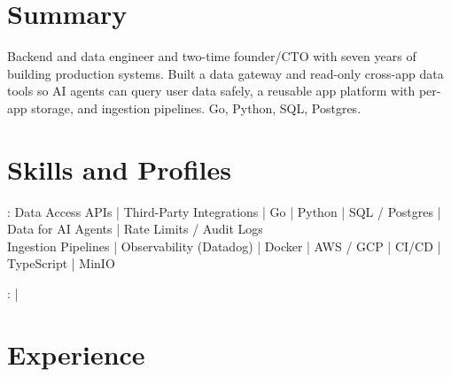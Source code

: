 \documentclass[print]{jack-resume}
\begin{document}
\pagecolor{darkmodeBackground}


\begin{minipage}[t][1cm][t]{.03\textwidth}
    \hfill
\end{minipage}

\section{Summary}
Backend and data engineer and two-time founder/CTO with seven years of building production systems. Built a data gateway and read-only cross-app data tools so AI agents can query user data safely, a reusable app platform with per-app storage, and ingestion pipelines. Go, Python, SQL, Postgres.
\sectionsep

\section{Skills and Profiles}
:
Data Access APIs \hfill | \hfill
Third-Party Integrations \hfill | \hfill
Go \hfill | \hfill
Python \hfill | \hfill
SQL / Postgres \hfill | \hfill
Data for AI Agents \hfill | \hfill
Rate Limits / Audit Logs \\
\hspace{1.0cm} Ingestion Pipelines \hfill | \hfill
Observability (Datadog) \hfill | \hfill
Docker \hfill | \hfill
AWS / GCP \hfill | \hfill
CI/CD \hfill | \hfill
TypeScript \hfill | \hfill
MinIO \\

\raggedright{
    :
      \href{https://www.linkedin.com/in/jack-sturtevant/}{ \ExternalLink} |
     \href{https://github.com/jacksturt}{ \ExternalLink}}

\section{Experience}
\end{document}
